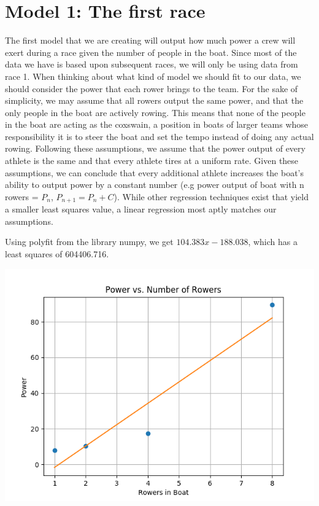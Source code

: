 \documentclass[12pt]{article} %
\begin{document}
\section*{Model 1: The first race}
The first model that we are creating will output how much power a crew will exert during a race given the number of people in the boat. Since most of the data we have is based upon subsequent races, we will only be using data from race 1. When thinking about what kind of model we should fit to our data, we should consider the power that each rower brings to the team. For the sake of simplicity, we may assume that all rowers output the same power, and that the only people in the boat are actively rowing. This means that none of the people in the boat are acting as the coxswain, a position in boats of larger teams whose responsibility it is to steer the boat and set the tempo instead of doing any actual rowing. Following these assumptions, we assume that the power output of every athlete is the same and that every athlete tires at a uniform rate. Given these assumptions, we can conclude that every additional athlete increases the boat's ability to output power by a constant number (e.g power output of boat with n rowers = $P_{n}$, $P_{n+1}=P_{n}+C$). While other regression techniques exist that yield a smaller least squares value, a linear regression most aptly matches our assumptions.

Using polyfit from the library numpy, we get $104.383x-188.038$, which has a least squares of 604406.716.

\includegraphics{Linear_Line_Done_Correctly.png}
\end{document}
